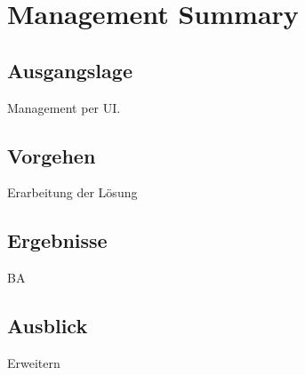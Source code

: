 \section{Management Summary}
\subsection*{Ausgangslage}
Management per UI.

\subsection*{Vorgehen}
Erarbeitung der Lösung


\subsection*{Ergebnisse}
BA


\subsection*{Ausblick}
Erweitern
\newpage